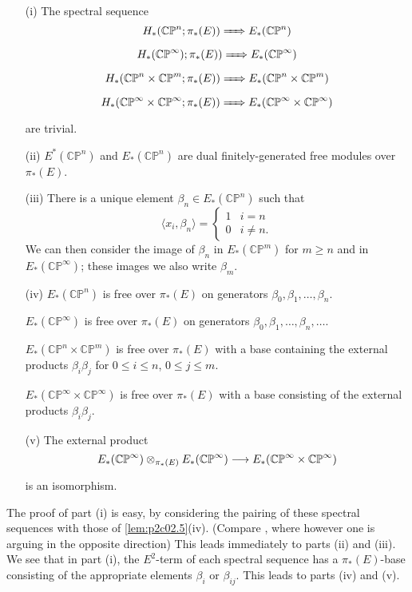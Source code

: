\documentclass[../main]{subfiles}
\begin{document}
\begin{customlemma}{2.14}
\label{lem:p2c02.14}
\begin{enumerate}
    \item[(i)] The spectral sequence \[H_\ast(\mathbb {CP}^n; \pi_\ast(E)) \xRightarrow{\phantom{.....}} E_\ast(\mathbb {CP}^n)\] \[H_\ast(\mathbb {CP}^\infty); \pi_\ast(E)) \xRightarrow{\phantom{.....}} E_\ast(\mathbb {CP}^\infty)\]\[H_\ast(\mathbb {CP}^n \times \mathbb {CP}^m; \pi_\ast(E)) \xRightarrow{\phantom{.....}} E_\ast(\mathbb {CP}^n \times \mathbb {CP}^m)\]\[H_\ast(\mathbb {CP}^\infty \times \mathbb {CP}^\infty; \pi_\ast(E)) \xRightarrow{\phantom{.....}} E_\ast(\mathbb {CP}^\infty \times \mathbb {CP}^\infty)\] are trivial.
    \item[(ii)] $E^\ast(\mathbb {CP}^n)$ and $E_\ast(\mathbb {CP}^n)$ are dual finitely-generated free modules over $\pi_\ast(E)$.
    \item[(iii)] There is a unique element $\beta_n \in E_\ast(\mathbb {CP}^n)$ such that \[\langle x_i, \beta_n\rangle = \begin{cases}1 & i = n \\ 0 & i \ne n.\end{cases}\] We can then consider the image of $\beta_n$ in $E_\ast(\mathbb {CP}^m)$ for $m \ge n$ and in $E_\ast(\mathbb {CP}^\infty)$; these images we also write $\beta_m$. 
    \item[(iv)] $E_\ast(\mathbb {CP}^n)$ is free over $\pi_\ast(E)$ on generators $\beta_0, \beta_1, \ldots, \beta_n$.
    
    $E_\ast(\mathbb {CP}^\infty)$ is free over $\pi_\ast(E)$ on generators $\beta_0, \beta_1, \ldots, \beta_n, \ldots$.
    
    $E_\ast(\mathbb {CP}^n \times \mathbb {CP}^m)$ is free over $\pi_\ast(E)$ with a base containing the external products $\beta_i \beta_j$ for $0 \le i \le n$, $0 \le j \le m$. 
    
    $E_\ast(\mathbb {CP}^\infty \times \mathbb {CP}^\infty)$ is free over $\pi_\ast(E)$ with a base consisting of the external products $\beta_i \beta_j$. 
    \item[(v)] The external product \[E_\ast(\mathbb {CP}^\infty) \otimes_{\pi_\ast(E)} E_\ast(\mathbb {CP}^\infty) \lar{} E_\ast(\mathbb {CP}^\infty \times \mathbb {CP}^\infty)\] is an isomorphism.
\end{enumerate}
\end{customlemma}

The proof of part (i) is easy, by considering the pairing of these spectral sequences with those of \ref{lem:p2c02.5}(iv). (Compare \cite[p.~21]{adams3}, where however one is arguing in the opposite direction) This leads immediately to parts (ii) and (iii). We see that in part (i), the $E^2$-term of each spectral sequence has a $\pi_\ast(E)$-base consisting of the appropriate elements $\beta_i$ or $\beta_{ij}$. This leads to parts (iv) and (v).
\end{document}
